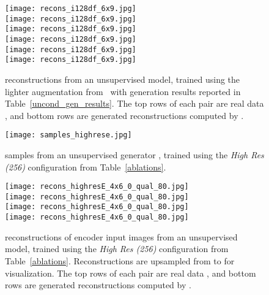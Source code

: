\begin{figure}
\centering

 \texttt{[image: recons\_i128df\_6x9.jpg]}
 \\ \vspace{0.1cm}
 \texttt{[image: recons\_i128df\_6x9.jpg]}
 \\ \vspace{0.1cm}
 \texttt{[image: recons\_i128df\_6x9.jpg]}
 \\ \vspace{0.1cm}
 \texttt{[image: recons\_i128df\_6x9.jpg]}
 \\ \vspace{0.1cm}
 \texttt{[image: recons\_i128df\_6x9.jpg]}
 \\ \vspace{0.1cm}
 \texttt{[image: recons\_i128df\_6x9.jpg]}
 \caption{
   reconstructions from an unsupervised \method{} model, trained using the lighter augmentation from~\cite{zurichfewer} with generation results reported in Table~\ref{uncond_gen_results}.
  The top rows of each pair are real data , and bottom rows are generated reconstructions computed by .
}
 \label{fig:recons_i128lightaug}
\end{figure}

\begin{figure}
\centering



 \texttt{[image: samples\_highrese.jpg]}
 \caption{
   samples  from an unsupervised \method{} generator , trained using the \textit{High Res  (256)} configuration from Table~\ref{ablations}.}
 \label{fig:samples_highrese}
\end{figure}

\begin{figure}
\centering



 \texttt{[image: recons\_highresE\_4x6\_0\_qual\_80.jpg]}
 \\ \vspace{0.2cm}
 \texttt{[image: recons\_highresE\_4x6\_0\_qual\_80.jpg]}
 \\ \vspace{0.2cm}
 \texttt{[image: recons\_highresE\_4x6\_0\_qual\_80.jpg]}
 \\ \vspace{0.2cm}
 \texttt{[image: recons\_highresE\_4x6\_0\_qual\_80.jpg]}

 \caption{
   reconstructions of  encoder input images from an unsupervised \method{} model, trained using the \textit{High Res  (256)} configuration from Table~\ref{ablations}.
  Reconstructions are upsampled from  to  for visualization.
  The top rows of each pair are real data , and bottom rows are generated reconstructions computed by .
}
 \label{fig:recons_highrese}
\end{figure}


